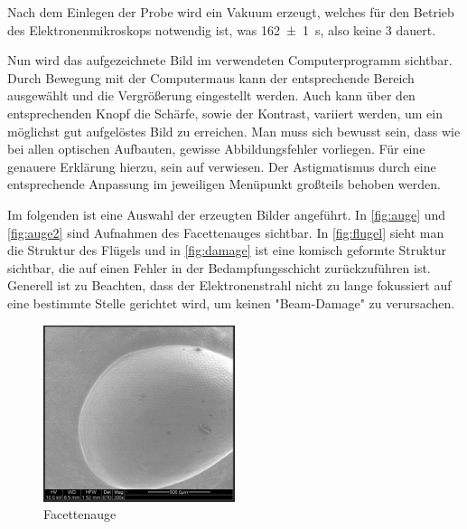 \documentclass[12pt,english,ngerman]{scrartcl}
\begin{document}
Nach dem Einlegen der Probe wird ein Vakuum erzeugt, welches für den Betrieb des Elektronenmikroskops notwendig ist, was 
\SI{162(1)}{\s}, also keine \SI{3}{\min} dauert.

Nun wird das aufgezeichnete Bild im verwendeten Computerprogramm sichtbar. Durch Bewegung mit der Computermaus kann 
der entsprechende Bereich ausgewählt und die Vergrößerung eingestellt werden. Auch kann über den entsprechenden Knopf die 
Schärfe, sowie der Kontrast, variiert werden, um ein möglichst gut aufgelöstes Bild zu erreichen. Man muss sich bewusst 
sein, dass wie bei allen
optischen Aufbauten, gewisse Abbildungsfehler vorliegen. Für eine genauere Erklärung hierzu, sein auf \cite{unterlagen} 
verwiesen. Der Astigmatismus durch eine entsprechende Anpassung im jeweiligen Menüpunkt großteils behoben werden.



Im folgenden ist eine Auswahl der erzeugten Bilder angeführt. In \autoref{fig:auge} und \autoref{fig:auge2} sind Aufnahmen
des Facettenauges sichtbar. In \autoref{fig:flugel} sieht man die Struktur des Flügels und in \autoref{fig:damage} ist eine
komisch geformte Struktur sichtbar, die auf einen Fehler in der Bedampfungsschicht zurückzuführen ist.
Generell ist zu Beachten, dass der Elektronenstrahl nicht zu lange fokussiert auf eine bestimmte Stelle gerichtet wird, um
keinen "Beam-Damage" zu verursachen.

\begin{figure}[H]
	\begin{center}
		\includegraphics[width =0.5\textwidth]{./figures/auge.png}
	\end{center}
	\caption{Facettenauge}
    \label{fig:auge}
\end{figure}
\end{document}
